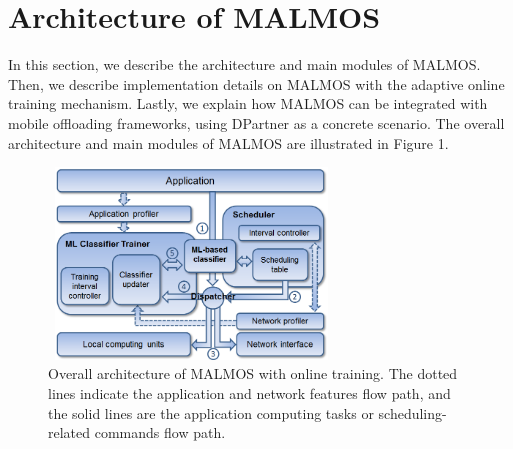 \documentclass[10pt, conference, compsocconf]{IEEEtran}
\begin{document}
\section{Architecture of MALMOS}
%
In this section, we describe the architecture and main modules of MALMOS.
%
Then, we describe implementation details on MALMOS with the adaptive
online training mechanism.
%
Lastly, we explain how MALMOS can be integrated with mobile offloading
frameworks, using DPartner as a concrete scenario.
%
The overall architecture and main modules of MALMOS are illustrated in
Figure 1.
%
\begin{figure}
\centering
\includegraphics[height=5.1cm, width=7.6cm]{Figure/figure1}
\caption{Overall architecture of MALMOS with online training. The dotted
lines indicate the application and network features flow path, and the
solid lines are the application computing tasks or scheduling-related
commands flow path.}
\end{figure}
%
\end{document}
